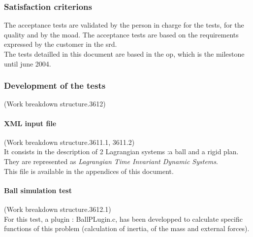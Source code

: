 \subsubsection{Satisfaction criterions}
The acceptance tests are validated by the person in charge for the tests, for the quality and by the \ac{moad}. The acceptance tests are
based on the requirements expressed by the customer in the \ac{srd}.\\
The tests detailled in this document are based in the \ac{op}, which is the milestone until june 2004.

\subsubsection{Development of the tests}
(Work breakdown structure.3612)\\
\paragraph{XML input file}
(Work breakdown structure.3611.1, 3611.2)\\
It consists in the description of 2 Lagrangian systems :a ball and a rigid plan. They are represented as \textit{Lagrangian Time Invariant Dynamic Systems}.\\
This file is available in the appendices of this document.

\paragraph{Ball simulation test}
(Work breakdown structure.3612.1)\\
For this test, a plugin : BallPLugin.c, has been developped to calculate specific functions of this problem (calculation of inertia, of
the mass and external forces).



